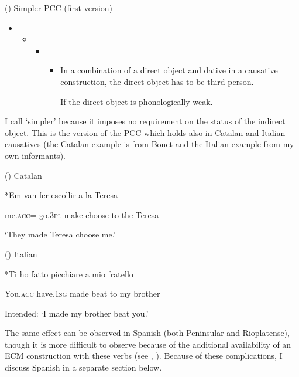 \documentclass[output=paper,modfonts,nonflat]{langsci/langscibook}
\begin{document}
()  Simpler PCC (first version)

\begin{itemize}
\item \begin{itemize}
\item \begin{itemize}
\item \begin{itemize}
\item \begin{styleListParagraph}
In a combination of a direct object and dative in a causative construction, the direct object has to be third person.
\end{styleListParagraph}
\begin{styleListParagraph}
If the direct object is phonologically weak. 
\end{styleListParagraph}
\end{itemize}
\end{itemize}
\end{itemize}
\end{itemize}

I call  ‘simpler’ because it imposes no requirement on the status of the indirect object. This is the version of the PCC which holds also in Catalan and Italian causatives (the Catalan example is from Bonet and the Italian example from my own informants). 

()  Catalan \citep[195]{Bonet1991}

  *Em       van     fer     escollir   a   la   Teresa

    me.\textsc{acc}=  go.\textsc{3pl}   make   choose   to   the   Teresa

‘They made Teresa choose me.’

()  Italian 

  *Ti     ho     fatto   picchiare     a   mio   fratello

  You.\textsc{acc}  have.\textsc{1sg}   made beat         to   my   brother

    Intended: ‘I made my brother beat you.’

The same effect can be observed in Spanish (both Peninsular and Rioplatense), though it is more difficult to observe because of the additional availability of an ECM construction with these verbs (see \citealt{Strozer1976}, \citealt{Torrego2010}). Because of these complications, I discuss Spanish in a separate section below.  
\end{document}
